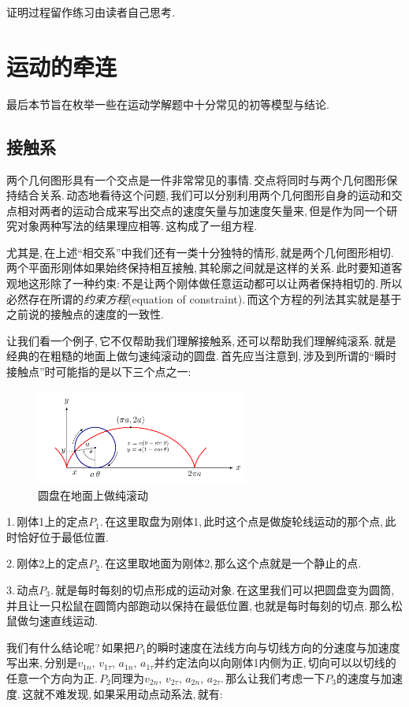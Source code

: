 证明过程留作练习由读者自己思考.

\section{运动的牵连}
最后本节旨在枚举一些在运动学解题中十分常见的初等模型与结论.

\subsection{接触系}
两个几何图形具有一个交点是一件非常常见的事情.\,交点将同时与两个几何图形保持结合关系.\,动态地看待这个问题,\,我们可以分别利用两个几何图形自身的运动和交点相对两者的运动合成来写出交点的速度矢量与加速度矢量来,\,但是作为同一个研究对象两种写法的结果理应相等.\,这构成了一组方程.

尤其是,\,在上述``相交系''中我们还有一类十分独特的情形,\,就是两个几何图形相切.\,两个平面形刚体如果始终保持相互接触,\,其轮廓之间就是这样的关系.\,此时要知道客观地这形除了一种约束:\,不是让两个刚体做任意运动都可以让两者保持相切的.\,所以必然存在所谓的\emph{约束方程}(equation of constraint).\,而这个方程的列法其实就是基于之前说的接触点的速度的一致性.

让我们看一个例子,\,它不仅帮助我们理解接触系,\,还可以帮助我们理解纯滚系.\,就是经典的在粗糙的地面上做匀速纯滚动的圆盘.\,首先应当注意到,\,涉及到所谓的``瞬时接触点''时可能指的是以下三个点之一:
\begin{figure}
\vspace{0.1cm}
\centering
\includegraphics[width=7cm]{image/6-1-11.png}
\caption{圆盘在地面上做纯滚动}
\end{figure}

1.\,刚体1上的定点$P_1$.\,在这里取盘为刚体1,\,此时这个点是做旋轮线运动的那个点,\,此时恰好位于最低位置.

2.\,刚体2上的定点$P_2$.\,在这里取地面为刚体2,\,那么这个点就是一个静止的点.

3.\,动点$P_3$.\,就是每时每刻的切点形成的运动对象.\,在这里我们可以把圆盘变为圆筒,\,并且让一只松鼠在圆筒内部跑动以保持在最低位置,\,也就是每时每刻的切点.\,那么松鼠做匀速直线运动.

我们有什么结论呢?\,如果把$P_1$的瞬时速度在法线方向与切线方向的分速度与加速度写出来,\,分别是$v_{1n},\,v_{1\tau},\,a_{1n},\,a_{1\tau}$并约定法向以向刚体1内侧为正,\,切向可以以切线的任意一个方向为正.\,$P_2$同理为$v_{2n},\,v_{2\tau},\,a_{2n},\,a_{2\tau}$.\,那么让我们考虑一下$P_3$的速度与加速度.\,这就不难发现,\,如果采用动点动系法,\,就有:

